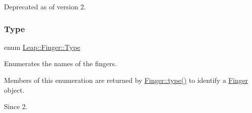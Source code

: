 Deprecated as of version 2. \mbox{\label{class_leap_1_1_finger_a1e94681e6d2168b2f854fcad7c8ac483}} 
\subsubsection{\texorpdfstring{Type}{Type}}
{\footnotesize\ttfamily enum \hyperlink{class_leap_1_1_finger_a1e94681e6d2168b2f854fcad7c8ac483}{Leap\+::\+Finger\+::\+Type}}

Enumerates the names of the fingers.

Members of this enumeration are returned by \hyperlink{class_leap_1_1_finger_a1fcede81ae68fa7060eeae5a6961edcc}{Finger\+::type()} to identify a \hyperlink{class_leap_1_1_finger}{Finger} object. \begin{DoxySince}{Since}
2. 
\end{DoxySince}
